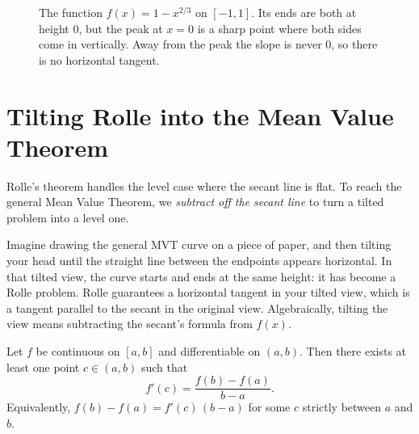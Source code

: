 \begin{figure}[htbp]
\centering
{}
\caption{The function $f(x)=1-x^{2/3}$ on $[-1,1]$. Its ends are both at height $0$,
but the peak at $x=0$ is a sharp point where both sides come in vertically. Away from
the peak the slope is never $0$, so there is no horizontal tangent.}
\label{ch15:fig-cusp}
\end{figure}

\section{Tilting Rolle into the Mean Value Theorem}

Rolle's theorem handles the level case where the secant line is flat. To
reach the general Mean Value Theorem, we
\emph{subtract off the secant line} to turn a tilted problem into a level one.

\begin{intuitionbox}
Imagine drawing the general MVT curve on a piece of paper, and then tilting your head
until the straight line between the endpoints appears horizontal. In that tilted
view, the curve starts and ends at the same height: it has become a Rolle
problem. Rolle guarantees a horizontal tangent in your tilted view, which is
a tangent parallel to the secant in the original view. Algebraically, tilting the
view means subtracting the secant's formula from $f(x)$.
\end{intuitionbox}

\begin{theorem}\label{ch15:thm-mvt}
Let $f$ be continuous on $[a,b]$ and differentiable on $(a,b)$. Then there exists at
least one point $c\in(a,b)$ such that
\[
  f'(c)=\frac{f(b)-f(a)}{b-a}.
\]
Equivalently, $f(b)-f(a)=f'(c)\,(b-a)$ for some $c$ strictly between $a$ and $b$.
\end{theorem}

